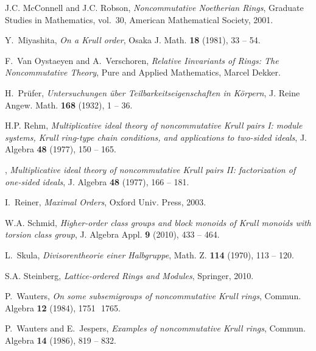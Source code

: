 \documentclass[a4paper]{amsart}
\theoremstyle{definition}
\numberwithin{equation}{section}
\begin{document}
\begin{thebibliography}{10}
J.C. McConnell and J.C. Robson, \emph{Noncommutative {N}oetherian {R}ings},
  Graduate {S}tudies in {M}athematics, vol.~30, American {M}athematical
  {S}ociety, 2001.

Y.~Miyashita, \emph{On a {K}rull order}, Osaka J. Math. \textbf{18} (1981), 33
  -- 54.

F.~Van Oystaeyen and A.~Verschoren, \emph{Relative {I}invariants of {R}ings:
  {T}he {N}oncommutative {T}heory}, Pure and Applied Mathematics, Marcel
  Dekker.

H.~Pr{\"u}fer, \emph{Untersuchungen {\"u}ber {T}eilbarkeitseigenschaften in
  {K}{\"o}rpern}, J. Reine Angew. Math. \textbf{168} (1932), 1 -- 36.

H.P. Rehm, \emph{Multiplicative ideal theory of noncommutative {K}rull pairs
  {I}: module systems, {K}rull ring-type chain conditions, and applications to
  two-sided ideals}, J. Algebra \textbf{48} (1977), 150 -- 165.

\bysame, \emph{Multiplicative ideal theory of noncommutative {K}rull pairs
  {II}: factorization of one-sided ideals}, J. Algebra \textbf{48} (1977), 166
  -- 181.

I.~Reiner, \emph{Maximal {O}rders}, Oxford Univ. Press, 2003.

W.A. Schmid, \emph{Higher-order class groups and block monoids of {K}rull
  monoids with torsion class group}, J. Algebra Appl. \textbf{9} (2010), 433 --
  464.

L.~Skula, \emph{Divisorentheorie einer {H}albgruppe}, Math. Z. \textbf{114}
  (1970), 113 -- 120.

S.A. Steinberg, \emph{Lattice-ordered {R}ings and {M}odules}, Springer, 2010.

P.~Wauters, \emph{On some subsemigroups of noncommutative {K}rull rings},
  Commun. Algebra \textbf{12} (1984), 1751  1765.

P.~Wauters and E.~Jespers, \emph{Examples of noncommutative {K}rull rings},
  Commun. Algebra \textbf{14} (1986), 819 -- 832.

\end{thebibliography}
\end{document}
